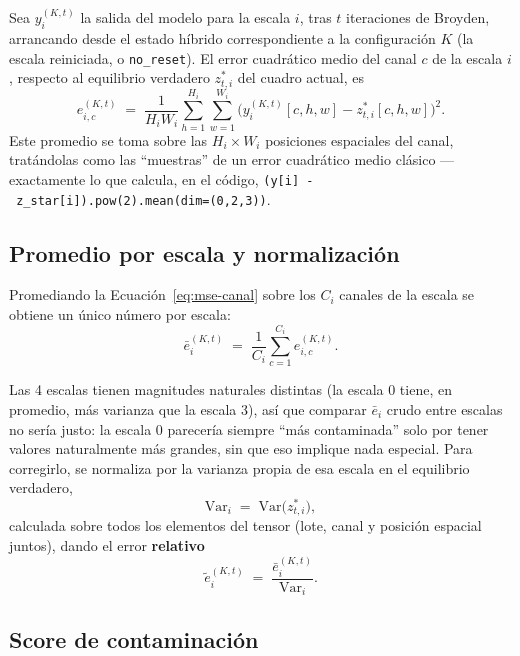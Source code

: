 \documentclass[11pt,a4paper]{article}
\newcommand{\code}[1]{\texttt{#1}}
\begin{document}
Sea $y_i^{(K,t)}$ la salida del modelo para la escala $i$, tras $t$ iteraciones de Broyden,
arrancando desde el estado híbrido correspondiente a la configuración $K$ (la escala reiniciada, o
\code{no\_reset}). El error cuadrático medio del canal $c$ de la escala $i$, respecto al equilibrio
verdadero $z^*_{t,i}$ del cuadro actual, es
\begin{equation}
  e_{i,c}^{(K,t)} \;=\; \frac{1}{H_i W_i} \sum_{h=1}^{H_i} \sum_{w=1}^{W_i}
  \Big( y_i^{(K,t)}[c,h,w] - z^*_{t,i}[c,h,w] \Big)^2 .
  \label{eq:mse-canal}
\end{equation}
Este promedio se toma sobre las $H_i \times W_i$ posiciones espaciales del canal, tratándolas como
las ``muestras'' de un error cuadrático medio clásico --- exactamente lo que calcula, en el código,
\code{(y[i]~-~z\_star[i]).pow(2).mean(dim=(0,2,3))}.

\subsection{Promedio por escala y normalización}
\label{sec:normalizacion}

Promediando la Ecuación~\eqref{eq:mse-canal} sobre los $C_i$ canales de la escala se obtiene un
único número por escala:
\begin{equation}
  \bar{e}_i^{(K,t)} \;=\; \frac{1}{C_i} \sum_{c=1}^{C_i} e_{i,c}^{(K,t)} .
  \label{eq:mse-escala}
\end{equation}

Las 4 escalas tienen magnitudes naturales distintas (la escala 0 tiene, en promedio, más varianza
que la escala 3), así que comparar $\bar e_i$ crudo entre escalas no sería justo: la escala 0
parecería siempre ``más contaminada'' solo por tener valores naturalmente más grandes, sin que eso
implique nada especial. Para corregirlo, se normaliza por la varianza propia de esa escala en el
equilibrio verdadero,
\begin{equation}
  \mathrm{Var}_i \;=\; \mathrm{Var}\big(z^*_{t,i}\big),
  \label{eq:varianza}
\end{equation}
calculada sobre todos los elementos del tensor (lote, canal y posición espacial juntos), dando el
error \textbf{relativo}
\begin{equation}
  \tilde{e}_i^{(K,t)} \;=\; \frac{\bar{e}_i^{(K,t)}}{\mathrm{Var}_i} .
  \label{eq:mse-normalizado}
\end{equation}

\subsection{Score de contaminación}
\label{sec:score-contaminacion}
\end{document}
